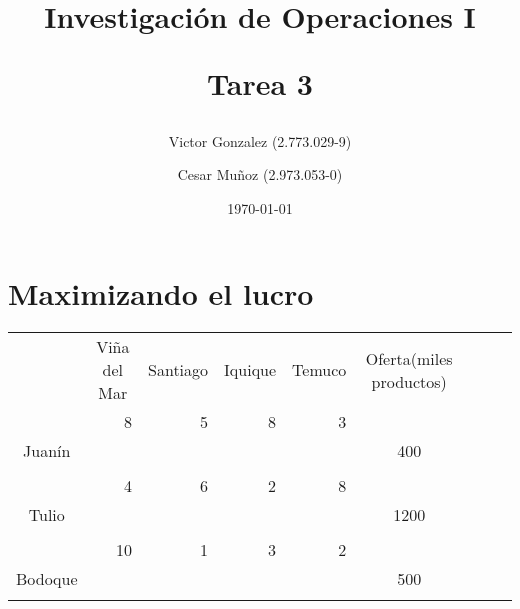 \documentclass[12pt,letterpaper]{article}
\begin{document}
\title{Investigación de Operaciones I \\ \begin{Large}Tarea 3\end{Large}} 
\author{Victor Gonzalez (2.773.029-9)
\and Cesar Muñoz (2.973.053-0)}
\date{\today}
\maketitle


\section{Maximizando el lucro}

\begin{center}
\begin{tabular}{ccc|ccc|ccc|ccc|ccc|ccc|ccc}
\multicolumn{3}{c|}{} & \multicolumn{3}{c}{Viña del Mar} & \multicolumn{3}{c}{Santiago} & \multicolumn{3}{c}{Iquique} & \multicolumn{3}{c|}{Temuco} & \multicolumn{3}{c}{Oferta(miles productos)}\\
\cline{1-15}
\multicolumn{3}{c|}{} & \multicolumn{3}{r|}{8} & \multicolumn{3}{r|}{5} & \multicolumn{3}{r|}{8} & \multicolumn{3}{r|}{3} \\
\multicolumn{3}{c|}{Juanín} & \multicolumn{3}{c|}{} & \multicolumn{3}{c|}{} & \multicolumn{3}{c|}{} & \multicolumn{3}{c|}{}& \multicolumn{3}{c}{400}\\
\multicolumn{3}{c|}{} & \multicolumn{3}{c|}{} & \multicolumn{3}{c|}{} & \multicolumn{3}{c|}{} & \multicolumn{3}{c|}{}\\
\cline{1-15}
\multicolumn{3}{c|}{} & \multicolumn{3}{r|}{4} & \multicolumn{3}{r|}{6} & \multicolumn{3}{r|}{2} & \multicolumn{3}{r|}{8} \\
\multicolumn{3}{c|}{Tulio} & \multicolumn{3}{c|}{} & \multicolumn{3}{c|}{} & \multicolumn{3}{c|}{} & \multicolumn{3}{c|}{}& \multicolumn{3}{c}{1200}\\
\multicolumn{3}{c|}{} & \multicolumn{3}{c|}{} & \multicolumn{3}{c|}{} & \multicolumn{3}{c|}{} & \multicolumn{3}{c|}{}\\
\cline{1-15}
\multicolumn{3}{c|}{} & \multicolumn{3}{r|}{10} & \multicolumn{3}{r|}{1} & \multicolumn{3}{r|}{3} & \multicolumn{3}{r|}{2} \\
\multicolumn{3}{c|}{Bodoque} & \multicolumn{3}{c|}{} & \multicolumn{3}{c|}{} & \multicolumn{3}{c|}{} & \multicolumn{3}{c|}{}& \multicolumn{3}{c}{500}\\
\multicolumn{3}{c|}{} & \multicolumn{3}{c|}{} & \multicolumn{3}{c|}{} & \multicolumn{3}{c|}{} & \multicolumn{3}{c|}{}\\

\end{tabular}
\end{center}
\end{document}
